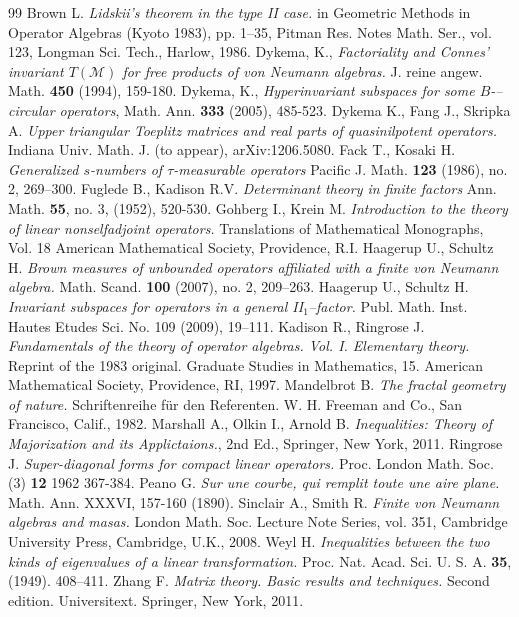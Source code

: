\documentclass{amsart}
\theoremstyle{plain}
\theoremstyle{remark}
\begin{document}
\begin{thebibliography}{99}
 Brown L. {\it Lidskii's theorem in the type II case.} in Geometric Methods in Operator Algebras (Kyoto 1983), pp. 1--35, Pitman Res. Notes Math. Ser., vol. 123, Longman Sci. Tech., Harlow, 1986.
 Dykema, K., {\it Factoriality and Connes' invariant $T(\mathcal{M})$ for free products of von Neumann algebras.} J. reine angew. Math. {\bf 450} (1994), 159-180.
 Dykema, K., {\it Hyperinvariant subspaces for some $B$-–circular operators}, Math. Ann. {\bf 333} (2005), 485-523.
 Dykema K., Fang J., Skripka A. {\it Upper triangular Toeplitz matrices and real parts of quasi\-nilpotent operators.} Indiana Univ. Math. J. (to appear), arXiv:1206.5080.
 Fack T., Kosaki H. {\it Generalized $s$-numbers of $\tau$-measurable operators} Pacific J. Math. {\bf 123} (1986), no. 2, 269--300.
 Fuglede B., Kadison R.V. {\it Determinant theory in finite factors} Ann. Math. {\bf 55}, no. 3, (1952), 520-530.
 Gohberg I., Krein M. {\it Introduction to the theory of linear nonselfadjoint operators.} Translations of Mathematical Monographs, Vol. 18 American Mathematical Society, Providence, R.I.
 Haagerup U., Schultz H. {\it Brown measures of unbounded operators affiliated with a finite von Neumann algebra.} Math. Scand. {\bf 100} (2007), no. 2, 209--263.
 Haagerup U., Schultz H. {\it Invariant subspaces for operators in a general II$_1$--factor.} Publ. Math. Inst. Hautes Etudes Sci. No. 109 (2009), 19--111.
 Kadison R., Ringrose J. {\it Fundamentals of the theory of operator algebras. Vol. I. Elementary theory.} Reprint of the 1983 original. Graduate Studies in Mathematics, 15. American Mathematical Society, Providence, RI, 1997.
 Mandelbrot B. {\it The fractal geometry of nature.} Schriftenreihe f\"ur den Referenten. W. H. Freeman and Co., San Francisco, Calif., 1982.
 Marshall A., Olkin I., Arnold B. {\it Inequalities: Theory of Majorization and its Applictaions.}, 2nd Ed., Springer, New York, 2011.
 Ringrose J. {\it Super-diagonal forms for compact linear operators.} Proc. London Math. Soc. (3) {\bf 12} 1962 367-384.
 Peano G. {\it Sur une courbe, qui remplit toute une aire plane.} Math. Ann. XXXVI, 157-160 (1890).
 Sinclair A., Smith R. {\it Finite von Neumann algebras and masas.} London Math. Soc. Lecture Note Series, vol. 351, Cambridge University Press, Cambridge, U.K., 2008.
 Weyl H. {\it Inequalities between the two kinds of eigenvalues of a linear transformation.} Proc. Nat. Acad. Sci. U. S. A. {\bf 35}, (1949). 408--411.
 Zhang F. {\it Matrix theory. Basic results and techniques.} Second edition. Universitext. Springer, New York, 2011.
\end{thebibliography}
\end{document}
